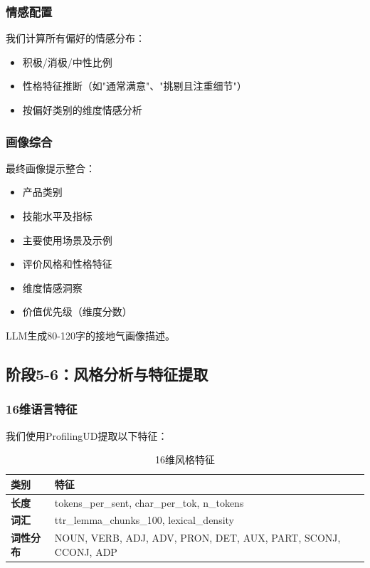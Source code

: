 \documentclass[11pt,a4paper]{article}
\begin{document}
\subsubsection{情感配置}

我们计算所有偏好的情感分布：
\begin{itemize}
    \item 积极/消极/中性比例
    \item 性格特征推断（如"通常满意"、"挑剔且注重细节"）
    \item 按偏好类别的维度情感分析
\end{itemize}

\subsubsection{画像综合}

最终画像提示整合：
\begin{itemize}
    \item 产品类别
    \item 技能水平及指标
    \item 主要使用场景及示例
    \item 评价风格和性格特征
    \item 维度情感洞察
    \item 价值优先级（维度分数）
\end{itemize}

LLM生成80-120字的接地气画像描述。

\subsection{阶段5-6：风格分析与特征提取}

\subsubsection{16维语言特征}

我们使用ProfilingUD提取以下特征：

\begin{table}[h]
\centering
\small
\begin{tabular}{ll}
\toprule
\textbf{类别} & \textbf{特征} \\
\midrule
\textbf{长度} & tokens\_per\_sent, char\_per\_tok, n\_tokens \\
\textbf{词汇} & ttr\_lemma\_chunks\_100, lexical\_density \\
\textbf{词性分布} & NOUN, VERB, ADJ, ADV, PRON, DET, AUX, PART, SCONJ, CCONJ, ADP \\
\bottomrule
\end{tabular}
\caption{16维风格特征}
\label{tab:features}
\end{table}
\end{document}
